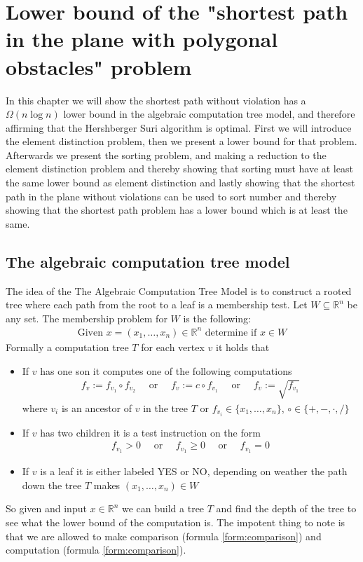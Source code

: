 \chapter{Lower bound of the "shortest path in the plane with polygonal obstacles" problem}
\label{chapter:lowerbound}
In this chapter we will show the shortest path without violation has a
$\Omega{(n\log n)}$ lower bound in the algebraic computation tree model, 
and therefore affirming that the Hershberger Suri algorithm is optimal.
First we will introduce the element distinction problem, then we present a
lower bound for that problem. Afterwards we present the sorting problem, and
making a reduction to the element distinction problem and thereby showing that
sorting must have at least the same lower bound as element distinction and
lastly showing that the shortest path in the plane without violations can be
used to sort number and thereby showing that the shortest path problem has a
lower bound which is at least the same.
\section{The algebraic computation tree model}
The idea of the The Algebraic Computation Tree Model is to construct a rooted
tree where each path from the root to a leaf is a membership test.
Let $W \subseteq \mathbb{R}^n$ be any set. The membership problem for $W$ is
the following:
\begin{align}
	\text{Given } x = (x_1,\dots,x_n) \in \mathbb{R}^n \text{ determine if } x\in W
\end{align}
Formally a computation tree $T$ for each vertex $v$ it holds that
\begin{itemize}
  \item If $v$ has one son it computes one of the following computations
			\begin{align}
				f_v:=f_{v_1} \circ f_{v_2}\quad \text{ or }\quad
				f_v:=c \circ f_{v_1}\quad \text{ or }\quad
				f_v:=\sqrt{f_{v_1}}
				\label{form:computation}
			\end{align}
  	 where $v_i$ is an ancestor of $v$ in the tree $T$ or $f_{v_i}\in
  	 \{x_1,\dots,x_n\}$, $\circ \in \{+,-,\cdot,/\}$
   \item If $v$ has two children it is a test instruction on the form
		\begin{align}
			 f_{v_1}>0\quad \text{ or }\quad
			 f_{v_1}\geq 0\quad \text{ or }\quad
			 f_{v_1}= 0
			 \label{form:comparison}
		\end{align}
   \item If $v$ is a leaf it is either labeled YES or NO, depending on
  	 weather the path down the tree $T$ makes $(x_1,\dots,x_n)\in W$
\end{itemize}
So given and input $x\in \mathbb{R}^n$ we can build a tree $T$ and find the
depth of the tree to see what the lower bound of the computation is.
The impotent thing to note is that we are allowed to make comparison (formula
\ref{form:comparison}) and computation (formula \ref{form:comparison}).

